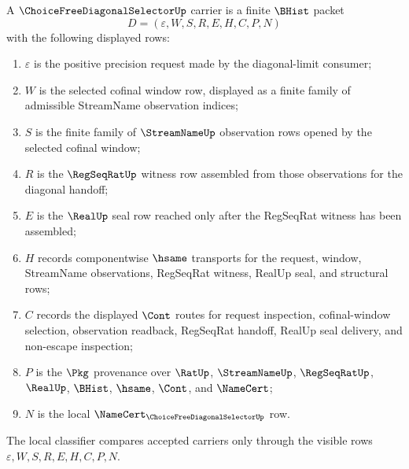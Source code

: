 \begin{definition}
\label{def:choice-free-diagonal-selector-carrier}
A $\ChoiceFreeDiagonalSelectorUp$ carrier is a finite $\BHist$ packet
$$
D=(\varepsilon,W,S,R,E,H,C,P,N)
$$
with the following displayed rows:
\begin{enumerate}
\item $\varepsilon$ is the positive precision request made by the diagonal-limit consumer;
\item $W$ is the selected cofinal window row, displayed as a finite family of admissible StreamName observation indices;
\item $S$ is the finite family of $\StreamNameUp$ observation rows opened by the selected cofinal window;
\item $R$ is the $\RegSeqRatUp$ witness row assembled from those observations for the diagonal handoff;
\item $E$ is the $\RealUp$ seal row reached only after the RegSeqRat witness has been assembled;
\item $H$ records componentwise $\hsame$ transports for the request, window, StreamName observations, RegSeqRat witness, RealUp seal, and structural rows;
\item $C$ records the displayed $\Cont$ routes for request inspection, cofinal-window selection, observation readback, RegSeqRat handoff, RealUp seal delivery, and non-escape inspection;
\item $P$ is the $\Pkg$ provenance over $\RatUp$, $\StreamNameUp$, $\RegSeqRatUp$, $\RealUp$, $\BHist$, $\hsame$, $\Cont$, and $\NameCert$;
\item $N$ is the local $\NameCert_{\ChoiceFreeDiagonalSelectorUp}$ row.
\end{enumerate}
The local classifier compares accepted carriers only through the visible rows $\varepsilon,W,S,R,E,H,C,P,N$.
\end{definition}

